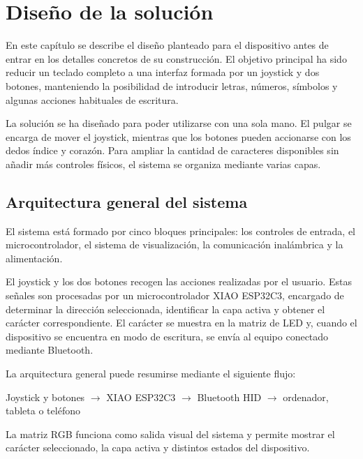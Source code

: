 \chapter{Diseño de la solución}
\label{ch:diseno}

En este capítulo se describe el diseño planteado para el dispositivo antes de entrar en los detalles concretos de su construcción. El objetivo principal ha sido reducir un teclado completo a una interfaz formada por un joystick y dos botones, manteniendo la posibilidad de introducir letras, números, símbolos y algunas acciones habituales de escritura.

La solución se ha diseñado para poder utilizarse con una sola mano. El pulgar se encarga de mover el joystick, mientras que los botones pueden accionarse con los dedos índice y corazón. Para ampliar la cantidad de caracteres disponibles sin añadir más controles físicos, el sistema se organiza mediante varias capas.

\section{Arquitectura general del sistema}
\label{sec:arquitectura-general}

El sistema está formado por cinco bloques principales: los controles de entrada, el microcontrolador, el sistema de visualización, la comunicación inalámbrica y la alimentación.

El joystick y los dos botones recogen las acciones realizadas por el usuario. Estas señales son procesadas por un microcontrolador XIAO ESP32C3, encargado de determinar la dirección seleccionada, identificar la capa activa y obtener el carácter correspondiente. El carácter se muestra en la matriz de LED y, cuando el dispositivo se encuentra en modo de escritura, se envía al equipo conectado mediante Bluetooth.

La arquitectura general puede resumirse mediante el siguiente flujo:

\begin{center}
    Joystick y botones
    $\longrightarrow$
    XIAO ESP32C3
    $\longrightarrow$
    Bluetooth HID
    $\longrightarrow$
    ordenador, tableta o teléfono
\end{center}

La matriz RGB funciona como salida visual del sistema y permite mostrar el carácter seleccionado, la capa activa y distintos estados del dispositivo.

